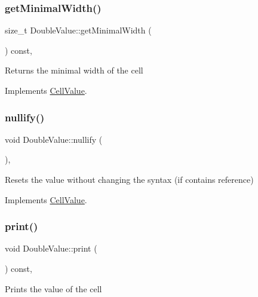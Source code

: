 \subsubsection{\texorpdfstring{get\+Minimal\+Width()}{getMinimalWidth()}}
{\footnotesize\ttfamily size\+\_\+t Double\+Value\+::get\+Minimal\+Width (\begin{DoxyParamCaption}{ }\end{DoxyParamCaption}) const\hspace{0.3cm}{\ttfamily [override]}, {\ttfamily [virtual]}}

Returns the minimal width of the cell 

Implements \hyperlink{classCellValue_ad96473ba3dd88b83da96c03ae31a2ede}{Cell\+Value}.

\mbox{\label{classDoubleValue_a9a558315ff92a14907c4936ecdee9f5f}} 
\subsubsection{\texorpdfstring{nullify()}{nullify()}}
{\footnotesize\ttfamily void Double\+Value\+::nullify (\begin{DoxyParamCaption}{ }\end{DoxyParamCaption})\hspace{0.3cm}{\ttfamily [override]}, {\ttfamily [virtual]}}

Resets the value without changing the syntax (if contains reference) 

Implements \hyperlink{classCellValue_af4f30a4b36e159f2f2bfc7ed83f1b37a}{Cell\+Value}.

\mbox{\label{classDoubleValue_a9c11fc60aedef2db2f43958c2e73eb95}} 
\subsubsection{\texorpdfstring{print()}{print()}}
{\footnotesize\ttfamily void Double\+Value\+::print (\begin{DoxyParamCaption}{ }\end{DoxyParamCaption}) const\hspace{0.3cm}{\ttfamily [override]}, {\ttfamily [virtual]}}

Prints the value of the cell 

